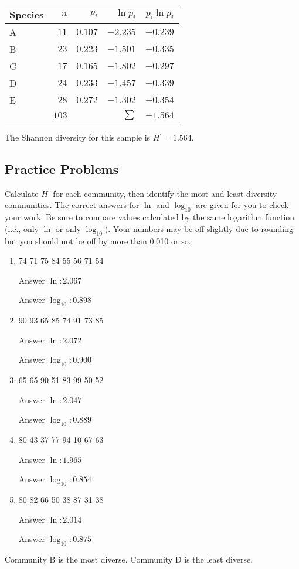 \documentclass[12pt]{exam}
\begin{document}
\begin{tabular}{lrrrr}
Species & $n$ & $p_i$ & $\ln p_i$ & $p_i \ln p_i$ \tabularnewline
\toprule
A & $11$ & $0.107$ & $-2.235$ & $-0.239$ \tabularnewline
B & $23$ & $0.223$ & $-1.501$ & $-0.335$ \tabularnewline
C & $17$ & $0.165$ & $-1.802$ & $-0.297$ \tabularnewline
D & $24$ & $0.233$ & $-1.457$ & $-0.339$ \tabularnewline
E & $28$ & $0.272$ & $-1.302$ & $-0.354$ \tabularnewline
\midrule
  &  $103$    &         & \hfill $\sum$ & $-1.564$\tabularnewline
\bottomrule
\end{tabular}

The Shannon diversity for this sample is $H^{\prime} = 1.564.$

\subsection*{Practice Problems}

Calculate $H^{\prime}$ for each community, then identify the most and least diversity communities.  The correct answers for $\ln$ and $\log_{10}$ are given for you to check your work. Be sure to compare values calculated by the same logarithm function (i.e., only $\ln$ or only $\log_{10}$). Your numbers may be off slightly due to rounding but you should not be off by more than 0.010 or so.

\begin{enumerate}[label=\textsc{Community \alph*:}]

\item 74 71 75 84 55 56 71 54

 Answer $\ln: 2.067$
 
 Answer $\log_{10}: 0.898$

\item 90 93 65 85 74 91 73 85

 Answer $\ln: 2.072$
 
 Answer $\log_{10}: 0.900$

\item 65 65 90 51 83 99 50 52

 Answer $\ln: 2.047$
 
 Answer $\log_{10}: 0.889$

\item 80 43 37 77 94 10 67 63

 Answer $\ln: 1.965$
 
 Answer $\log_{10}: 0.854$

\item 80 82 66 50 38 87 31 38

 Answer $\ln: 2.014$
 
 Answer $\log_{10}: 0.875$

\end{enumerate}

Community B is the most diverse. Community D is the least diverse.
\end{document}
